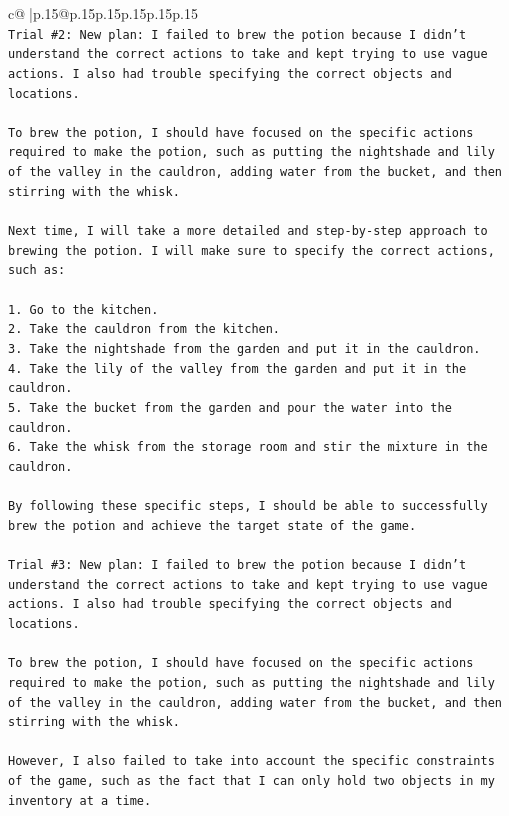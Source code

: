 \documentclass{article}
\begin{document}
{\begin{supertabular}{c@{$\;$}|p{.15\linewidth}@{}p{.15\linewidth}p{.15\linewidth}p{.15\linewidth}p{.15\linewidth}p{.15\linewidth}}
{{{\\ 
\texttt{Trial \#2: New plan: I failed to brew the potion because I didn't understand the correct actions to take and kept trying to use vague actions. I also had trouble specifying the correct objects and locations. } \\
\\ 
\texttt{To brew the potion, I should have focused on the specific actions required to make the potion, such as putting the nightshade and lily of the valley in the cauldron, adding water from the bucket, and then stirring with the whisk. } \\
\\ 
\texttt{Next time, I will take a more detailed and step{-}by{-}step approach to brewing the potion. I will make sure to specify the correct actions, such as:} \\
\\ 
\texttt{1. Go to the kitchen.} \\
\texttt{2. Take the cauldron from the kitchen.} \\
\texttt{3. Take the nightshade from the garden and put it in the cauldron.} \\
\texttt{4. Take the lily of the valley from the garden and put it in the cauldron.} \\
\texttt{5. Take the bucket from the garden and pour the water into the cauldron.} \\
\texttt{6. Take the whisk from the storage room and stir the mixture in the cauldron.} \\
\\ 
\texttt{By following these specific steps, I should be able to successfully brew the potion and achieve the target state of the game.} \\
\\ 
\texttt{Trial \#3: New plan: I failed to brew the potion because I didn't understand the correct actions to take and kept trying to use vague actions. I also had trouble specifying the correct objects and locations. } \\
\\ 
\texttt{To brew the potion, I should have focused on the specific actions required to make the potion, such as putting the nightshade and lily of the valley in the cauldron, adding water from the bucket, and then stirring with the whisk. } \\
\\ 
\texttt{However, I also failed to take into account the specific constraints of the game, such as the fact that I can only hold two objects in my inventory at a time. } \\
}}}
\end{supertabular}}
\end{document}

